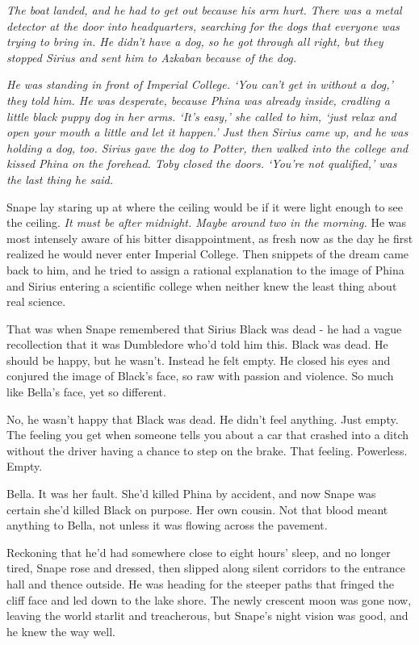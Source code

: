 \emph{The boat landed, and he had to get out because his arm hurt. There was a metal detector at the door into headquarters, searching for the dogs that everyone was trying to bring in. He didn't have a dog, so he got through all right, but they stopped Sirius and sent him to Azkaban because of the dog.}

\emph{He was standing in front of Imperial College. `You can't get in without a dog,' they told him. He was desperate, because Phina was already inside, cradling a little black puppy dog in her arms. `It's easy,' she called to him, `just relax and open your mouth a little and let it happen.' Just then Sirius came up, and he was holding a dog, too. Sirius gave the dog to Potter, then walked into the college and kissed Phina on the forehead. Toby closed the doors. `You're not qualified,' was the last thing he said.}

Snape lay staring up at where the ceiling would be if it were light enough to see the ceiling. \emph{It must be after midnight. Maybe around two in the morning.} He was most intensely aware of his bitter disappointment, as fresh now as the day he first realized he would never enter Imperial College. Then snippets of the dream came back to him, and he tried to assign a rational explanation to the image of Phina and Sirius entering a scientific college when neither knew the least thing about real science.

That was when Snape remembered that Sirius Black was dead - he had a vague recollection that it was Dumbledore who'd told him this. Black was dead. He should be happy, but he wasn't. Instead he felt empty. He closed his eyes and conjured the image of Black's face, so raw with passion and violence. So much like Bella's face, yet so different.

No, he wasn't happy that Black was dead. He didn't feel anything. Just empty. The feeling you get when someone tells you about a car that crashed into a ditch without the driver having a chance to step on the brake. That feeling. Powerless. Empty.

Bella. It was her fault. She'd killed Phina by accident, and now Snape was certain she'd killed Black on purpose. Her own cousin. Not that blood meant anything to Bella, not unless it was flowing across the pavement.

Reckoning that he'd had somewhere close to eight hours' sleep, and no longer tired, Snape rose and dressed, then slipped along silent corridors to the entrance hall and thence outside. He was heading for the steeper paths that fringed the cliff face and led down to the lake shore. The newly crescent moon was gone now, leaving the world starlit and treacherous, but Snape's night vision was good, and he knew the way well.

